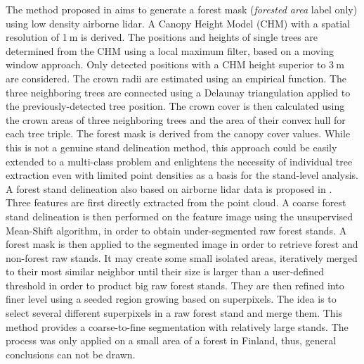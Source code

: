 The method proposed in \citep{eysn2012forest} aims to generate a forest mask (\textit{forested area} label only) using low density airborne lidar. A Canopy Height Model (CHM) with a spatial resolution of 1$\:$m is derived. The positions and heights of single trees are determined from the CHM using a local maximum filter, based on a moving window approach. Only detected positions with a CHM height superior to 3$\:$m are considered. The crown radii are estimated using an empirical function. The three neighboring trees are connected using a Delaunay triangulation applied to the previously-detected tree position. The crown cover is then calculated using the crown areas of three neighboring trees and the area of their convex hull for each tree triple. The forest mask is derived from the canopy cover values. While this is not a genuine stand delineation method, this approach could be easily extended to a multi-class problem and enlightens the necessity of individual tree extraction even with limited point densities as a basis for the stand-level analysis.\\

A forest stand delineation also based on airborne lidar data is proposed in \citep{wu2014data}. Three features are first directly extracted from the point cloud. A coarse forest stand delineation is then performed on the feature image using the unsupervised Mean-Shift algorithm, in order to obtain under-segmented raw forest stands. A forest mask is then applied to the segmented image in order to retrieve forest and non-forest raw stands. It may create some small isolated areas, iteratively merged to their most similar neighbor until their size is larger than a user-defined threshold in order to product big raw forest stands. They are then refined into finer level using a seeded region growing based on superpixels. The idea is to select several different superpixels in a raw forest stand and merge them. This method provides a coarse-to-fine segmentation with relatively large stands. The process was only applied on a small area of a forest in Finland, thus, general conclusions can not be drawn. \\

